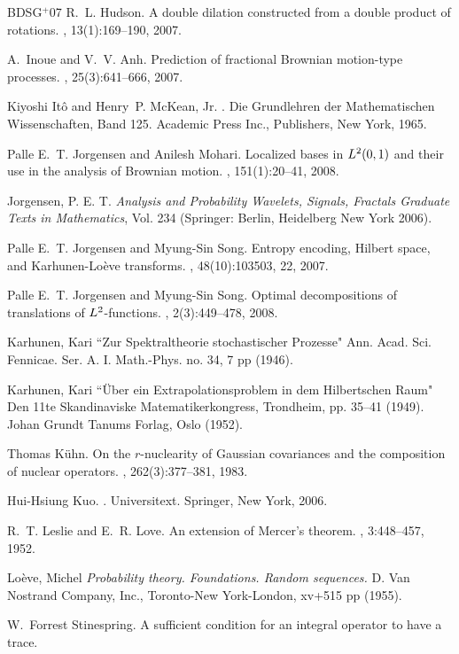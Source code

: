 \documentclass{amsart}
\theoremstyle{definition}
\theoremstyle{remark}
\numberwithin{equation}{section}
\begin{document}
\begin{thebibliography}{BDSG{{$^{{+}}$}}07}
R.~L. Hudson.
\newblock A double dilation constructed from a double product of rotations.
, 13(1):169--190, 2007.

A.~Inoue and V.~V. Anh.
\newblock Prediction of fractional {B}rownian motion-type processes.
, 25(3):641--666, 2007.

Kiyoshi It{\^o} and Henry~P. McKean, Jr.
.
\newblock Die Grundlehren der Mathematischen Wissenschaften, Band 125. Academic
  Press Inc., Publishers, New York, 1965.

Palle E.~T. Jorgensen and Anilesh Mohari.
\newblock Localized bases in {$L\sp 2(0,1)$} and their use in the analysis of
  {B}rownian motion.
, 151(1):20--41, 2008.

 Jorgensen, P. E. T. {\em Analysis and Probability Wavelets, Signals, Fractals Graduate Texts in Mathematics}, Vol. 234 (Springer: Berlin, Heidelberg New York 2006). 

Palle E.~T. Jorgensen and Myung-Sin Song.
\newblock Entropy encoding, {H}ilbert space, and {K}arhunen-{L}o\`eve
  transforms.
, 48(10):103503, 22, 2007.

Palle E.~T. Jorgensen and Myung-Sin Song.
\newblock Optimal decompositions of translations of {$L\sp 2$}-functions.
, 2(3):449--478, 2008.

 Karhunen, Kari ``Zur Spektraltheorie stochastischer Prozesse"  Ann. Acad. Sci. Fennicae. Ser. A. I. Math.-Phys. no. 34, 7 pp (1946).

 Karhunen, Kari ``\"{U}ber ein Extrapolationsproblem in dem Hilbertschen Raum"  Den 11te Skandinaviske Matematikerkongress, Trondheim, pp. 35--41 (1949). Johan Grundt Tanums Forlag, Oslo (1952). 

Thomas K{\"u}hn.
\newblock On the {$r$}-nuclearity of {G}aussian covariances and the composition
  of nuclear operators.
, 262(3):377--381, 1983.

Hui-Hsiung Kuo.
.
\newblock Universitext. Springer, New York, 2006.

R.~T. Leslie and E.~R. Love.
\newblock An extension of {M}ercer's theorem.
, 3:448--457, 1952.

Lo\`{e}ve, Michel {\em Probability theory. Foundations. Random sequences.} D. Van Nostrand Company, Inc., Toronto-New York-London, xv+515 pp (1955). 

W.~Forrest Stinespring.
\newblock A sufficient condition for an integral operator to have a trace.

\end{thebibliography}
\end{document}
